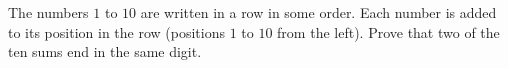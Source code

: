 The numbers $1$ to $10$ are written in a row in some order. Each number is added to its position in the row (positions $1$ to $10$ from the left). Prove that two of the ten sums end in the same digit.
